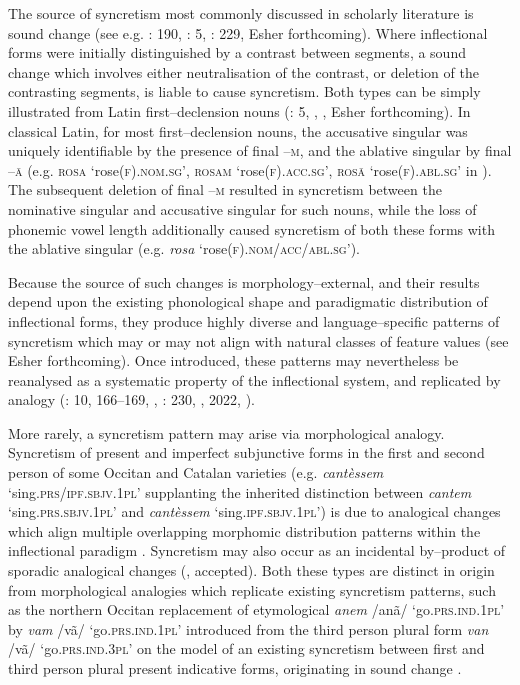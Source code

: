 \documentclass[output=paper]{langscibook}
\begin{document}
The source of syncretism most commonly discussed in scholarly literature is sound change (see e.g. \citealt{Meiser1992}: 190, \citealt{BaermanEtAl2005}: 5, \citealt{Baerman2008}: 229, Esher forthcoming). Where inflectional forms were initially distinguished by a contrast between segments, a sound change which involves either neutralisation of the contrast, or deletion of the contrasting segments, is liable to cause syncretism. Both types can be simply illustrated from Latin first–declension nouns (\citealt{BaermanEtAl2005}: 5, \citealt{Pinkster1990}, \citealt{Sornicola2011}, Esher forthcoming). In classical Latin, for most first–declension nouns, the accusative singular was uniquely identifiable by the presence of final –\textsc{m,} and the ablative singular by final \textsc{–ā} (e.g. \textsc{rosa} ‘rose(\textsc{f).nom.sg}’, \textsc{rosam} ‘rose(\textsc{f).acc.sg}’, \textsc{rosā} ‘rose(\textsc{f).abl.sg}’ in ). The subsequent deletion of final –\textsc{m} resulted in syncretism between the nominative singular and accusative singular for such nouns, while the loss of phonemic vowel length additionally caused syncretism of both these forms with the ablative singular (e.g. \textit{rosa} ‘rose(\textsc{f).nom/acc/abl.sg}’). 

Because the source of such changes is morphology–external, and their results depend upon the existing phonological shape and paradigmatic distribution of inflectional forms, they produce highly diverse and language–specific patterns of syncretism which may or may not align with natural classes of feature values (see Esher forthcoming). Once introduced, these patterns may nevertheless be reanalysed as a systematic property of the inflectional system, and replicated by analogy (\citealt{BaermanEtAl2005}: 10, 166–169, \citealt{Hansson2007}, \citealt{Baerman2008}: 230, \citealt{Hinzelin2011,Hinzelin2012}, 2022, \citealt{Esher2020}).

More rarely, a syncretism pattern may arise via morphological analogy. Syncretism of present and imperfect subjunctive forms in the first and second person of some Occitan and Catalan varieties (e.g. \textit{cantèssem} ‘sing.\textsc{prs/ipf.sbjv.1pl}’ supplanting the inherited distinction between \textit{cantem} ‘sing.\textsc{prs.sbjv.1pl}’ and \textit{cantèssem} ‘sing.\textsc{ipf.sbjv.1pl}’) is due to analogical changes which align multiple overlapping morphomic distribution patterns within the inflectional paradigm \citep{Esher2022}. Syncretism may also occur as an incidental by–product of sporadic analogical changes (\citealt{Esher2024}, accepted). Both these types are distinct in origin from morphological analogies which replicate existing syncretism patterns, such as the northern Occitan replacement of etymological \textit{anem} /anã/ ‘go.\textsc{prs.ind.1pl}’ by \textit{vam} /vã/ ‘go.\textsc{prs.ind.1pl}’ introduced from the third person plural form \textit{van} /vã/ ‘go.\textsc{prs.ind.3pl}’ on the model of an existing syncretism between first and third person plural present indicative forms, originating in sound change \citep{Esher2020}.
\end{document}
